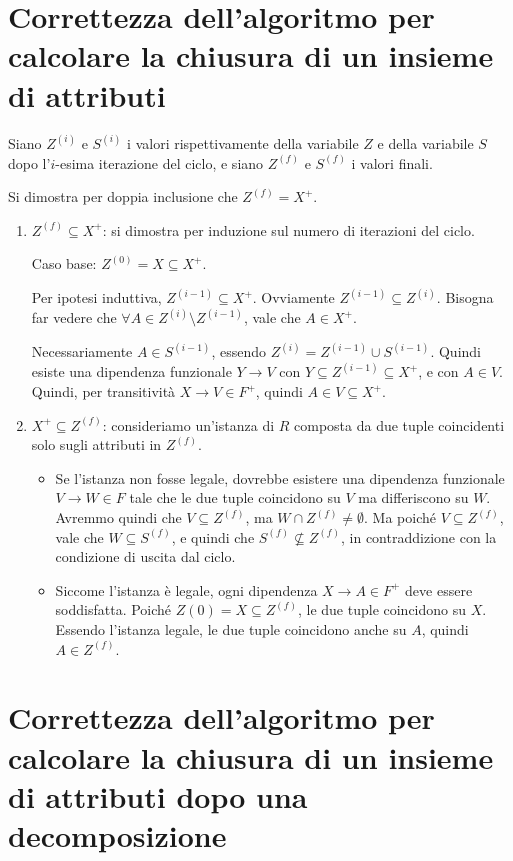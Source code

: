 \section{Correttezza dell'algoritmo per calcolare la chiusura di un insieme di attributi}

Siano $Z^{(i)}$ e $S^{(i)}$ i valori rispettivamente della variabile $Z$ e della variabile $S$ dopo l'$i$-esima iterazione del ciclo, e siano $Z^{(f)}$ e $S^{(f)}$ i valori finali.

Si dimostra per doppia inclusione che $Z^{(f)} = X^+$.
\begin{enumerate}
    \item $Z^{(f)} \subseteq X^+$: si dimostra per induzione sul numero di iterazioni del ciclo. 

    Caso base: $Z^{(0)} = X \subseteq X^+$.

    Per ipotesi induttiva, $Z^{(i-1)} \subseteq X^+$. Ovviamente $Z^{(i-1)} \subseteq Z^{(i)}$. Bisogna far vedere che $\forall A \in Z^{(i)} \setminus Z^{(i-1)}$, vale che $A \in X^+$.

    Necessariamente $A \in S^{(i-1)}$, essendo $Z^{(i)} = Z^{(i-1)} \cup S^{(i-1)}$. Quindi esiste una dipendenza funzionale $Y \to V$ con $Y \subseteq Z^{(i-1)} \subseteq X^+$, e con $A \in V$. Quindi, per transitivit\`a $X \to V \in F^+$, quindi $A \in V \subseteq X^+$.
    \item $X^+ \subseteq Z^{(f)}$: consideriamo un'istanza di $R$ composta da due tuple coincidenti solo sugli attributi in $Z^{(f)}$.
    \begin{itemize}
        \item Se l'istanza non fosse legale, dovrebbe esistere una dipendenza funzionale $V \to W \in F$ tale che le due tuple coincidono su $V$ ma differiscono su $W$. Avremmo quindi che $V \subseteq Z^{(f)}$, ma $W \cap Z^{(f)} \neq \emptyset$. Ma poich\'e $V \subseteq Z^{(f)}$, vale che $W \subseteq S^{(f)}$, e quindi che $S^{(f)} \not\subseteq Z^{(f)}$, in contraddizione con la condizione di uscita dal ciclo.
        \item Siccome l'istanza \`e legale, ogni dipendenza $X \to A \in F^+$ deve essere soddisfatta. Poich\'e $Z{(0)} = X \subseteq Z^{(f)}$, le due tuple coincidono su $X$. Essendo l'istanza legale, le due tuple coincidono anche su $A$, quindi $A \in Z^{(f)}$.
    \end{itemize}
\end{enumerate}

\section{Correttezza dell'algoritmo per calcolare la chiusura di un insieme di attributi dopo una decomposizione}

